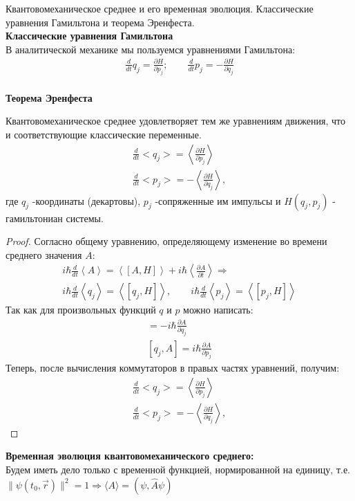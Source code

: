 \documentclass[__main__.tex]{subfiles}
\begin{document}
Квантовомеханическое среднее и его временная эволюция. Классические уравнения Гамильтона и теорема Эренфеста.\\ 
\textbf{Классические уравнения Гамильтона}\\
В аналитической механике мы пользуемся уравнениями Гамильтона:\\
\begin{gather}
\frac{d}{dt}q_j=\frac{\partial H}{\partial p_j}; \qquad \frac{d}{dt}p_j=-\frac{\partial H}{\partial q_j}
\end{gather}\\
\textbf{Теорема Эренфеста}\\
\begin{theorem}
Квантовомеханическое среднее удовлетворяет тем же уравнениям движения, что и соответствующие классические переменные.\\
\begin{gather}
\frac{d}{dt}<q_j> = \left<\frac{\partial H}{\partial p_j}\right>\\ 
\frac{d}{dt}<p_j> = - \left<\frac{\partial H}{\partial q_j}\right>,
\end{gather}
где $q_j$ -координаты (декартовы), $p_j$ -сопряженные им импульсы и $H(q_j,p_j)$ - гамильтониан системы.
\end{theorem}
\begin{proof}
Согласно общему уравнению, определяющему изменение во времени среднего значения $A$:
\begin{gather}
i\hbar \frac{d}{dt}\left<A\right>=\left<\left[A,H\right]\right>+i\hbar\left<\frac{\partial A}{\partial t} \right> \Longrightarrow \\ i\hbar\frac{d}{dt}\left<q_j\right>=\left<\left[q_j,H\right]\right>, \qquad i\hbar\frac{d}{dt}\left<p_j\right>=\left<\left[p_j,H\right]\right>
\end{gather}
Так как для произвольных функций $q$ и $p$ можно написать:
\begin{gather}
[p_j,A] = -i\hbar \frac{\partial A}{\partial q_j}\\
[q_j,A] = i\hbar \frac{\partial A}{\partial p_j}
\end{gather}
Теперь, после вычисления коммутаторов в правых частях уравнений, получим:
\begin{gather}
\frac{d}{dt}<q_j> = \left<\frac{\partial H}{\partial p_j}\right>\\ 
\frac{d}{dt}<p_j> = - \left<\frac{\partial H}{\partial q_j}\right>,
\end{gather}
\end{proof}
\textbf{Временная эволюция квантовомеханического среднего:}\\
Будем иметь дело только с временной функцией, нормированной на единицу, т.е.
 $\|\psi(t_{0}, \vec{r})\|^{2}=1
 \Rightarrow\langle A \rangle =(\psi, \hat{A}\psi)$
\end{document}
